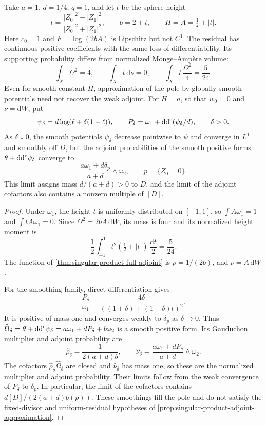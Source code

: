 \begin{example}\label{ex:singular-product-adjoint-boundary}
Take $a=1$, $d=1/4$, $q=1$, and let $t$ be the sphere height
\[
 t=\frac{|Z_0|^2-|Z_1|^2}{|Z_0|^2+|Z_1|^2},\qquad
 b=2+t,\qquad H=A=\tfrac12+|t|.
\]
Here $c_0=1$ and $F=\log(2bA)$ is Lipschitz but not $C^1$. The residual has continuous positive coefficients with the same loss of differentiability. Its supporting probability differs from normalized Monge--Amp\`ere volume:
\[
 \int_X\Omega^2=4,\qquad
 \int_Xt\,\mathrm{d}\nu=0,\qquad
 \int_Xt\,\frac{\Omega^2}{4}=\frac5{24}.
\]
Even for smooth constant $H$, approximation of the pole by globally smooth potentials need not recover the weak adjoint. For $H=a$, so that $w_0=0$ and $\nu=\mathrm{d}W$, put
\[
 \psi_\delta=d\log(\ell+\delta(1-\ell)),\qquad
 P_\delta=\omega_1+\mathrm{dd}^{\mathrm{c}}(\psi_\delta/d),\qquad\delta>0.
\]
As $\delta\downarrow0$, the smooth potentials $\psi_\delta$ decrease pointwise to $\psi$ and converge in $L^1$ and smoothly off $D$, but the adjoint probabilities of the smooth positive forms $\theta+\mathrm{dd}^{\mathrm{c}}\psi_\delta$ converge to
\[
 \frac{a\omega_1+d\delta_p}{a+d}\wedge\omega_2,
 \qquad p=\{Z_0=0\}.
\]
This limit assigns mass $d/(a+d)>0$ to $D$, and the limit of the adjoint cofactors also contains a nonzero multiple of $[D]$.
\end{example}
\begin{proof}
Under $\omega_1$, the height $t$ is uniformly distributed on $[-1,1]$, so $\int A\omega_1=1$ and $\int tA\omega_1=0$. Since $\Omega^2=2bA\,\mathrm{d}W$, its mass is four and its normalized height moment is
\[
 \frac12\int_{-1}^1 t^2(\tfrac12+|t|)\,\frac{\mathrm{d}t}{2}
       =\frac5{24}.
\]
The function of \cref{thm:singular-product-full-adjoint} is $\rho=1/(2b)$, and $\nu=A\,\mathrm{d}W$.

For the smoothing family, direct differentiation gives
\[
 \frac{P_\delta}{\omega_1}
       =\frac{4\delta}{((1+\delta)+(1-\delta)t)^2}.
\]
It is positive of mass one and converges weakly to $\delta_p$ as $\delta\to0$. Thus $\widehat\Omega_\delta=\theta+\mathrm{dd}^{\mathrm{c}}\psi_\delta=a\omega_1+dP_\delta+b\omega_2$ is a smooth positive form. Its Gauduchon multiplier and adjoint probability are
\[
 \widehat\rho_\delta=\frac1{2(a+d)b},\qquad
 \widehat\nu_\delta=\frac{a\omega_1+dP_\delta}{a+d}\wedge\omega_2.
\]
The cofactors $\widehat\rho_\delta\widehat\Omega_\delta$ are closed and $\widehat\nu_\delta$ has mass one, so these are the normalized multiplier and adjoint probability. Their limits follow from the weak convergence of $P_\delta$ to $\delta_p$. In particular, the limit of the cofactors contains $d[D]/(2(a+d)b(p))$. These smoothings fill the pole and do not satisfy the fixed-divisor and uniform-residual hypotheses of \cref{prop:singular-product-adjoint-approximation}.
\end{proof}
